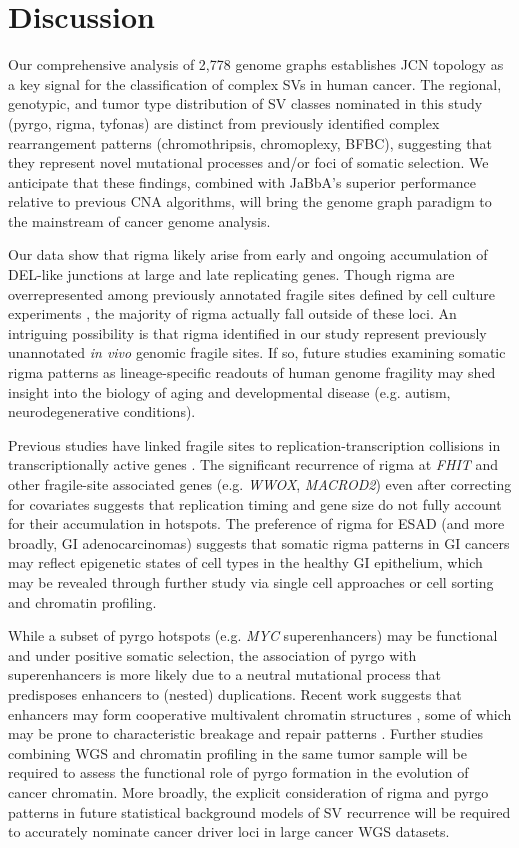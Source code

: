 \documentclass[phd,tocprelim]{cornell}
\begin{document}
\section{Discussion}
Our comprehensive analysis of 2,778 genome graphs establishes JCN topology as a key signal for the classification of complex SVs in human cancer. The regional, genotypic, and tumor type distribution of SV classes nominated in this study (pyrgo, rigma, tyfonas) are distinct from previously identified complex rearrangement patterns (chromothripsis, chromoplexy, BFBC), suggesting that they represent novel mutational processes and/or foci of somatic selection.  We anticipate that these findings, combined with JaBbA's superior performance relative to previous CNA algorithms, will bring the genome graph paradigm to the mainstream of cancer genome analysis.

Our data show that rigma likely arise from early and ongoing accumulation of DEL-like junctions at large and late replicating genes.  Though rigma are overrepresented among  previously annotated fragile sites defined by cell culture experiments \cite{schwartz2006,fungtammasan2012, ohta1996, Ma2012-ym}, the majority of rigma actually fall outside of these loci.  An intriguing possibility is that rigma identified in our study represent previously unannotated \textit{in vivo} genomic fragile sites. If so, future studies examining somatic rigma patterns as lineage-specific readouts of human genome fragility may shed insight into the biology of aging and developmental disease (e.g. autism, neurodegenerative conditions).

Previous studies have linked fragile sites to replication-transcription collisions in transcriptionally active genes \cite{Helmrich2011-yj,Wilson2015-zg,Blin2019-kf}.  The significant recurrence of rigma at \textit{FHIT} and other fragile-site associated genes (e.g. \textit{WWOX}, \textit{MACROD2}) even after correcting for covariates suggests that replication timing and gene size do not fully account for their accumulation in hotspots.   The preference of rigma for ESAD (and more broadly, GI adenocarcinomas) suggests that somatic rigma patterns in GI cancers may reflect epigenetic states of cell types in the healthy GI epithelium, which may be revealed through further study via single cell approaches or cell sorting and chromatin profiling.

While  a subset of pyrgo hotspots (e.g. \textit{MYC} superenhancers) may be functional and under positive somatic selection, the association of pyrgo with superenhancers is more likely due to a neutral mutational process that predisposes enhancers to (nested) duplications.  Recent work suggests that enhancers may form cooperative multivalent chromatin structures \cite{Hnisz:2017fz}, some of which may be prone to characteristic breakage and repair patterns \cite{canela2017}. Further studies combining WGS and chromatin profiling in the same tumor sample will be required to assess the functional role of pyrgo formation in the evolution of cancer chromatin.  More broadly, the explicit consideration of rigma and pyrgo patterns in future statistical background models of SV recurrence will be required to accurately nominate cancer driver loci in large cancer WGS datasets.
\end{document}
